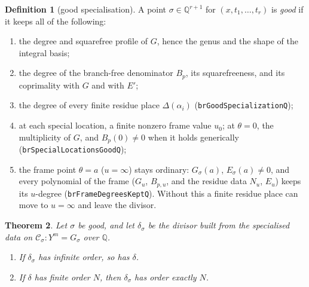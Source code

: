 \documentclass[11pt]{article}
\newtheorem{theorem}{Theorem}[section]
\theoremstyle{definition}
\newtheorem{definition}[theorem]{Definition}
\theoremstyle{remark}
\newcommand{\Q}{\mathbb{Q}}
\newcommand{\code}[1]{\texttt{#1}}
\begin{document}
\begin{definition}[good specialisation]
A point $\sigma\in\Q^{r+1}$ for $(x,t_1,\dots,t_r)$ is \emph{good} if it keeps
all of the following:
\begin{enumerate}
\item the degree and squarefree profile of $G$, hence the genus and the shape of
  the integral basis;
\item the degree of the branch-free denominator $B_p$, its squarefreeness, and
  its coprimality with $G$ and with $E'$;
\item the degree of every finite residue place $\Delta(\alpha_i)$
  (\code{brGoodSpecializationQ});
\item at each special location, a finite nonzero frame value $u_0$; at
  $\theta=0$, the multiplicity of $G$, and $B_p(0)\neq0$ when it holds
  generically (\code{brSpecialLocationsGoodQ});
\item the frame point $\theta=a$ ($u=\infty$) stays ordinary: $G_\sigma(a)$,
  $E_\sigma(a)\neq0$, and every polynomial of the frame ($G_u$, $B_{p,u}$, and
  the residue data $N_u$, $E_u$) keeps its $u$-degree
  (\code{brFrameDegreesKeptQ}). Without this a finite residue place can move to
  $u=\infty$ and leave the divisor.
\end{enumerate}
\end{definition}

\begin{theorem}\label{thm:E3}
Let $\sigma$ be good, and let $\delta_\sigma$ be the divisor built from the
specialised data on $\mathcal C_\sigma: Y^m=G_\sigma$ over $\Q$.
\begin{enumerate}
\item If $\delta_\sigma$ has infinite order, so has $\delta$.
\item If $\delta$ has finite order $N$, then $\delta_\sigma$ has order exactly $N$.
\end{enumerate}
\end{theorem}
\end{document}
